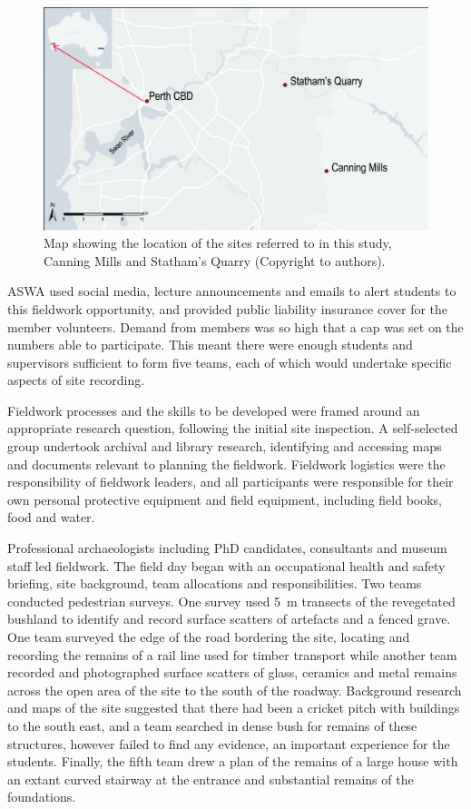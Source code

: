 \documentclass[%
]{ijsra}
\begin{document}
	\begin{figure} %
		\includegraphics[width=\linewidth]{figures/Fyfe-Figure01}
		\caption{Map showing the location of the sites referred to in this study, Canning Mills and Statham’s Quarry (Copyright to authors).}
		\centering
		\label{fig:Fyfe-Figure01}
	\end{figure}
	
	ASWA used social media, lecture announcements and emails to alert students to this fieldwork opportunity, and provided public liability insurance cover for the member volunteers. 
	Demand from members was so high that a cap was set on the numbers able to participate. 
	This meant there were enough students and supervisors sufficient to form five teams, each of which would undertake specific aspects of site recording.
	
	Fieldwork processes and the skills to be developed were framed around an appropriate research question, following the initial site inspection. A self-selected group undertook archival and library research, identifying and accessing maps and documents relevant to planning the fieldwork.
	Fieldwork logistics were the responsibility of fieldwork leaders, and all participants were responsible for their own personal protective equipment and field equipment, including field books, food and water.
	
	Professional archaeologists including PhD candidates, consultants and museum staff led fieldwork. 
	The field day began with an occupational health and safety briefing, site background, team allocations and responsibilities. Two teams conducted pedestrian surveys. One survey used \SI{5}{\meter} transects of the revegetated bushland to identify and record surface scatters of artefacts and a fenced grave. 
	One team surveyed the edge of the road bordering the site, locating and recording the remains of a rail line used for timber transport while another team recorded and photographed surface scatters of glass, ceramics and metal remains across the open area of the site to the south of the roadway. 
	Background research and maps of the site suggested that there had been a cricket pitch with buildings to the south east, and a team searched in dense bush for remains of these structures, however failed to find any evidence, an important experience for the students. 
	Finally, the fifth team drew a plan of the remains of a large house with an extant curved stairway at the entrance and substantial remains of the foundations.
	
\end{document}

